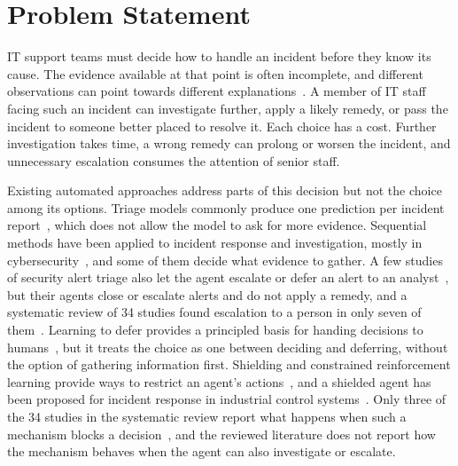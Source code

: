 \section{Problem Statement}

IT support teams must decide how to handle an incident before they know its cause. The evidence available at that point is often incomplete, and different observations can point towards different explanations~\cite{chen2020,remil2024}. A member of IT staff facing such an incident can investigate further, apply a likely remedy, or pass the incident to someone better placed to resolve it. Each choice has a cost. Further investigation takes time, a wrong remedy can prolong or worsen the incident, and unnecessary escalation consumes the attention of senior staff.

Existing automated approaches address parts of this decision but not the choice among its options. Triage models commonly produce one prediction per incident report~\cite{chen2020,remil2024}, which does not allow the model to ask for more evidence. Sequential methods have been applied to incident response and investigation, mostly in cybersecurity~\cite{ren2025,dunsin2025,kim2025,hammar2025}, and some of them decide what evidence to gather. A few studies of security alert triage also let the agent escalate or defer an alert to an analyst~\cite{sahin2026,kovtun2026}, but their agents close or escalate alerts and do not apply a remedy, and a systematic review of 34 studies found escalation to a person in only seven of them~\cite{opol2026slr}. Learning to defer provides a principled basis for handing decisions to humans~\cite{madras2018,joshi2023}, but it treats the choice as one between deciding and deferring, without the option of gathering information first. Shielding and constrained reinforcement learning provide ways to restrict an agent's actions~\cite{alshiekh2018,achiam2017}, and a shielded agent has been proposed for incident response in industrial control systems~\cite{alauthman2026}. Only three of the 34 studies in the systematic review report what happens when such a mechanism blocks a decision~\cite{opol2026slr}, and the reviewed literature does not report how the mechanism behaves when the agent can also investigate or escalate.

